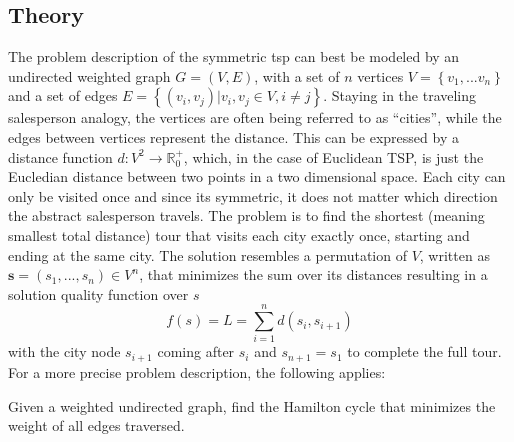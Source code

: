 \subsection{Theory}
\label{chap:tsp-theory}
The problem description of the symmetric \gls{tsp}  can best be modeled by an undirected weighted graph $G = (V,E)$, with a set of $n$ vertices $V = \left\lbrace v_1, ... v_n\right\rbrace $ and a set of edges $E = \left\lbrace (v_i,v_j) | v_i,v_j \in V, i \neq j\right\rbrace $. Staying in the traveling salesperson analogy, the vertices are often being referred to as \enquote{cities}, while the edges between vertices represent the distance. This can be expressed by a distance function $d : V^2 \rightarrow \mathbb{R}_{0}^{+}$, which, in the case of Euclidean TSP, is just the Eucledian distance between two points in a two dimensional space.  Each city can only be visited once and since its symmetric, it does not matter which direction the abstract salesperson travels. The problem is to find the shortest (meaning smallest total distance) tour that visits each city exactly once, starting and ending at the same city. The solution resembles a permutation of $V$, written as $\textbf{s} = (s_1,...,s_n) \in V^n$, that minimizes the sum over its distances resulting in a solution quality function over $s$
\begin{equation}
	\label{eq:solution_quality}
	f(s) = L = \sum_{i=1}^{n} d(s_i,s_{i+1})
\end{equation}
with the city node $s_{i+1}$ coming after $s_i$ and $s_{n+1} = s_1$ to complete the full tour.
For a more precise problem description, the following applies: 


\begin{list}{}{}
	\item 	Given a weighted undirected graph, find the Hamilton cycle that minimizes the weight of all edges traversed.
\end{list}

